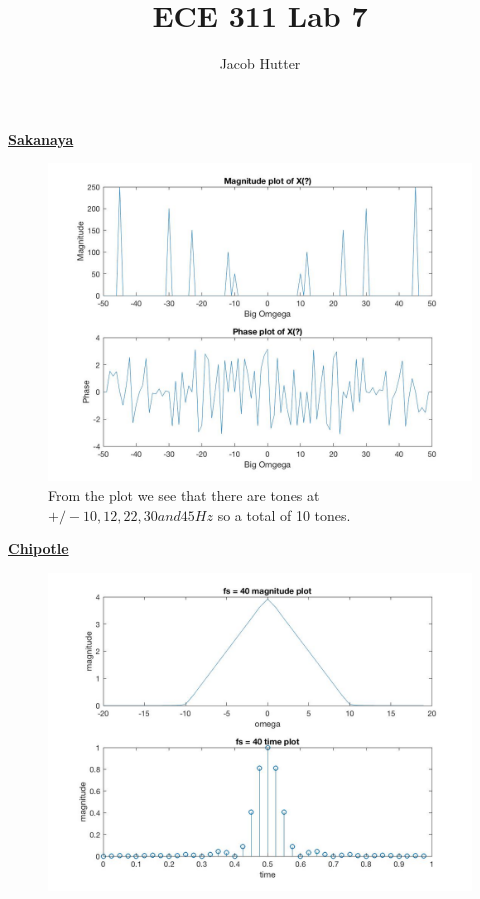 \documentclass{article}
\author{Jacob Hutter}
\title{ECE 311 Lab 7}
\begin{document}
\maketitle

\color{red}
\underline{\textbf{Sakanaya}}
\color{black}
\begin{figure}[H]

\includegraphics[scale=.5]{Sakanaya1}
From the plot we see that there are tones at $+/- 10,12,22,30 and 45 Hz$ so a total of 10 tones.
\end{figure}

\color{red}
\underline{\textbf{Chipotle}}
\color{black}
\begin{figure}[H]

\includegraphics[scale=.5]{Chipotle1}
\end{figure}
\end{document}
